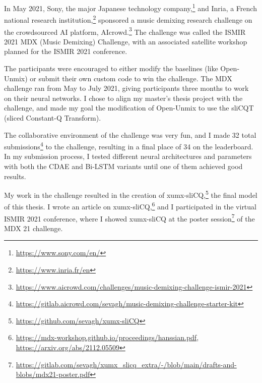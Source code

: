 \documentclass[report.tex]{subfiles}
\begin{document}
\begin{appendices}
In May 2021, Sony, the major Japanese technology company,\footnote{\url{https://www.sony.com/en/}} and Inria, a French national research institution,\footnote{\url{https://www.inria.fr/en}} sponsored a music demixing research challenge on the crowdsourced AI platform, AIcrowd.\footnote{\url{https://www.aicrowd.com/challenges/music-demixing-challenge-ismir-2021}} The challenge was called the ISMIR 2021 MDX (Music Demixing) Challenge, with an associated satellite workshop planned for the ISMIR 2021 conference.

The participants were encouraged to either modify the baselines (like Open-Unmix) or submit their own custom code to win the challenge. The MDX challenge ran from May to July 2021, giving participants three months to work on their neural networks. I chose to align my master's thesis project with the challenge, and made my goal the modification of Open-Unmix to use the sliCQT (sliced Constant-Q Transform).

The collaborative environment of the challenge was very fun, and I made 32 total submissions\footnote{\url{https://gitlab.aicrowd.com/sevagh/music-demixing-challenge-starter-kit}} to the challenge, resulting in a final place of 34 on the leaderboard. In my submission process, I tested different neural architectures and parameters with both the CDAE and Bi-LSTM variants until one of them achieved good results.

My work in the challenge resulted in the creation of xumx-sliCQ,\footnote{\url{https://github.com/sevagh/xumx-sliCQ}} the final model of this thesis. I wrote an article on xumx-sliCQ,\footnote{\url{https://mdx-workshop.github.io/proceedings/hanssian.pdf}, \url{https://arxiv.org/abs/2112.05509}} and I participated in the virtual ISMIR 2021 conference, where I showed xumx-sliCQ at the poster session\footnote{\url{https://gitlab.com/sevagh/xumx_slicq_extra/-/blob/main/drafts-and-blobs/mdx21-poster.pdf}} of the MDX 21 challenge.

\end{appendices}
\end{document}
